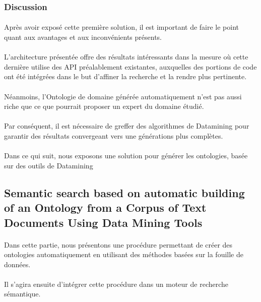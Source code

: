 \documentclass[12pt, a4paper, oneside]{book}
\begin{document}
\subsubsection{Discussion}
\paragraph{}
Après avoir exposé cette première solution, il est important de faire le point quant aux avantages et aux inconvénients présents. 
\paragraph{}
L'architecture présentée offre des résultats intéressants dans la mesure où cette dernière utilise des API préalablement existantes, auxquelles des portions de code ont été intégrées dans le but d'affiner la recherche et la rendre plus pertinente.
\paragraph{}
Néanmoins, l'Ontologie de domaine générée automatiquement n'est pas aussi riche que ce que pourrait proposer un expert du domaine étudié.
\paragraph{}
Par conséquent, il est nécessaire de greffer des algorithmes de Datamining pour garantir des résultats convergeant vers une générations plus complètes. 
\paragraph{}
Dans ce qui suit, nous exposons une solution pour générer les ontologies, basée sur des outils de Datamining

\newpage
\subsection{Semantic search based on automatic building of an Ontology from a Corpus of Text Documents Using Data Mining Tools} 

\paragraph{}
Dans cette partie, nous présentons une procédure permettant de créer des ontologies automatiquement en utilisant des méthodes basées sur la fouille de données.\cite{article}
\paragraph{}
Il s'agira ensuite d'intégrer cette procédure dans un moteur de recherche sémantique.
\end{document}
